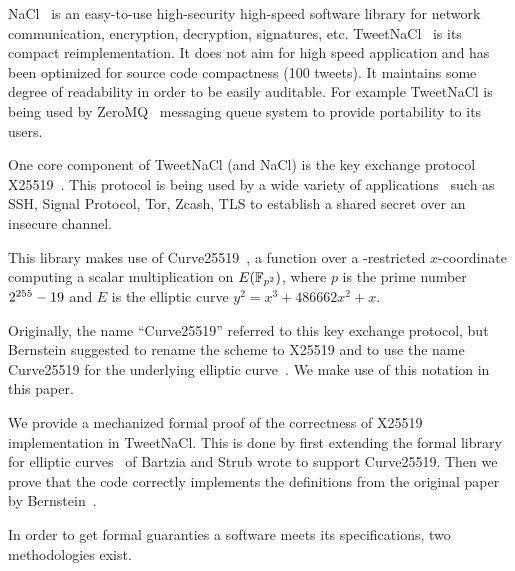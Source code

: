 NaCl~\cite{BLS12} is an easy-to-use high-security high-speed software library
for network communication, encryption, decryption, signatures, etc.
TweetNaCl~\cite{BGJ+15} is its compact reimplementation.
It does not aim for high speed application and has been optimized for source
code compactness (100 tweets). It maintains some degree of readability in order
to be easily auditable. For example TweetNaCl is being used by ZeroMQ~\cite{zmq}
messaging queue system to provide portability to its users.


One core component of TweetNaCl (and NaCl) is the key exchange protocol X25519~\cite{rfc7748}.
This protocol is being used by a wide variety of applications~\cite{this-that-use-curve25519}
such as SSH, Signal Protocol, Tor, Zcash, TLS to establish a shared secret over
an insecure channel.

This library makes use of Curve25519~\cite{Ber06}, a function over a -restricted
$x$-coordinate computing a scalar multiplication on $E(\mathbb{F}_{p^2})$, where $p$ is
the prime number $2^{255}-19$ and $E$ is the elliptic curve $y^2 = x^3 + 486662 x^2 + x$.

Originally, the name ``Curve25519'' referred to this key exchange protocol,
but Bernstein suggested to rename the scheme to X25519 and to use the name
Curve25519 for the underlying elliptic curve~\cite{Ber14}.
We make use of this notation in this paper.

We provide a mechanized formal proof of the correctness of X25519
implementation in TweetNaCl. This is done by first extending the formal library for
elliptic curves~\cite{DBLP:conf/itp/BartziaS14} of Bartzia and Strub wrote to
support Curve25519. Then we prove that the code correctly implements the definitions
from the original paper by Bernstein~\cite{Ber14}.

In order to get formal guaranties a software meets its
specifications, two methodologies exist.

